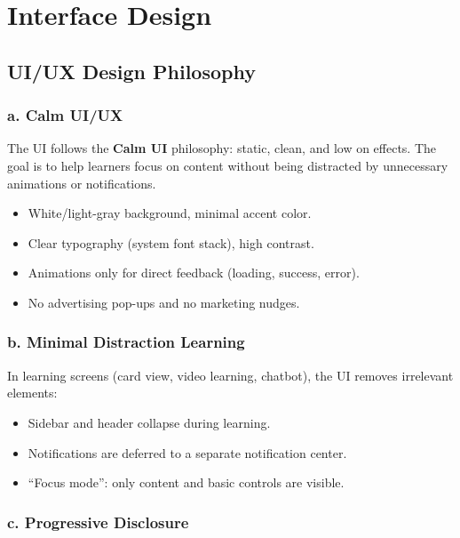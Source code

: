 \section{Interface Design}
\label{sec:interface-design}

\subsection{UI/UX Design Philosophy}

\subsubsection*{a. Calm UI/UX}

The UI follows the \textbf{Calm UI} philosophy: static, clean, and low on
effects. The goal is to help learners focus on content without being
distracted by unnecessary animations or notifications.

\begin{itemize}
    \item White/light-gray background, minimal accent color.
    \item Clear typography (system font stack), high contrast.
    \item Animations only for direct feedback (loading, success, error).
    \item No advertising pop-ups and no marketing nudges.
\end{itemize}

\subsubsection*{b. Minimal Distraction Learning}

In learning screens (card view, video learning, chatbot), the UI removes
irrelevant elements:

\begin{itemize}
    \item Sidebar and header collapse during learning.
    \item Notifications are deferred to a separate notification center.
    \item ``Focus mode'': only content and basic controls are visible.
\end{itemize}

\subsubsection*{c. Progressive Disclosure}

